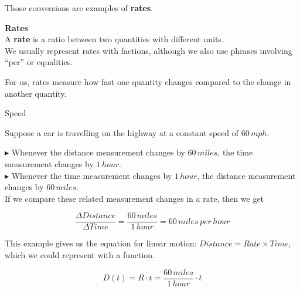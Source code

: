 \documentclass{ximera}
\begin{document}
Those conversions are examples of \textbf{rates}. 








\begin{definition} \textbf{\textcolor{green!50!black}{Rates}} \\

A \textbf{rate} is a ratio between two quantities with different units.   \\



We usually represent rates with factions, although we also use phrases involving ``per'' or equalities.

\end{definition}


For us, rates measure how fast one quantity changes compared to the change in another quantity.











\begin{example} Speed


Suppose a car is travelling on the highway at a constant speed of $60 \, mph$.


$\blacktriangleright$ Whenever the distance measurement changes by $60 \, miles$, the time measurement changes by $1 \, hour$. \\
$\blacktriangleright$ Whenever the time measurement changes by $1 \, hour$, the distance measurement changes by $60 \, miles$. \\




If we compare these related measurement changes in a rate, then we get

\[
\frac{\Delta Distance}{\Delta Time} = \frac{60 \, miles}{1 \, hour} = 60 \,miles \, per \, hour
\]


\end{example} 



This example gives us the equation for linear motion: $Distance = Rate \times Time$, which we could represent with a function.

\[
D(t) = R \cdot t =  \frac{60 \, miles}{1 \, hour} \cdot t
\]
\end{document}
